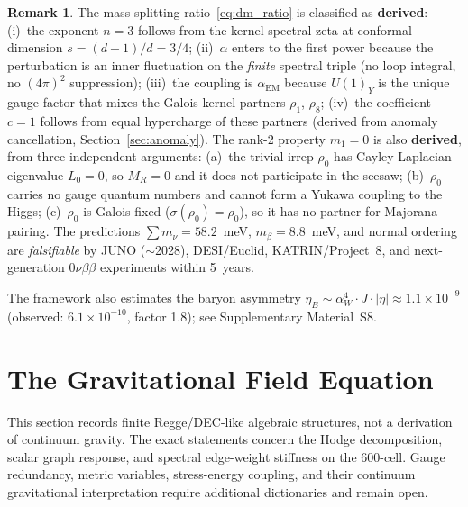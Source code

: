 \documentclass[12pt,a4paper]{article}
\theoremstyle{definition}
\newtheorem{remark}{Remark}
\begin{document}
\begin{remark}
The mass-splitting ratio~\eqref{eq:dm_ratio} is classified as \textbf{derived}: (i)~the exponent $n = 3$ follows from the kernel spectral zeta at conformal dimension $s = (d{-}1)/d = 3/4$; (ii)~$\alpha$ enters to the first power because the perturbation is an inner fluctuation on the \emph{finite} spectral triple (no loop integral, no $(4\pi)^2$ suppression); (iii)~the coupling is $\alpha_{\text{EM}}$ because $U(1)_Y$ is the unique gauge factor that mixes the Galois kernel partners $\rho_1$, $\rho_8$; (iv)~the coefficient $c = 1$ follows from equal hypercharge of these partners (derived from anomaly cancellation, Section~\ref{sec:anomaly}).  The rank-2 property $m_1 = 0$ is also \textbf{derived}, from three independent arguments: (a)~the trivial irrep $\rho_0$ has Cayley Laplacian eigenvalue $L_0 = 0$, so $M_R = 0$ and it does not participate in the seesaw; (b)~$\rho_0$ carries no gauge quantum numbers and cannot form a Yukawa coupling to the Higgs; (c)~$\rho_0$ is Galois-fixed ($\sigma(\rho_0) = \rho_0$), so it has no partner for Majorana pairing.  The predictions $\sum m_\nu = 58.2$~meV, $m_\beta = 8.8$~meV, and normal ordering are \emph{falsifiable} by JUNO ($\sim$2028), DESI/Euclid, KATRIN/Project~8, and next-generation $0\nu\beta\beta$ experiments within 5~years.
\end{remark}

The framework also estimates the baryon asymmetry $\eta_B \sim \alpha_W^4 \cdot J \cdot |\eta| \approx 1.1 \times 10^{-9}$ (observed: $6.1 \times 10^{-10}$, factor 1.8); see Supplementary Material~S8.




\section{The Gravitational Field Equation}
\label{sec:gravity}

This section records finite Regge/DEC-like algebraic structures, not a derivation of continuum gravity.  The exact statements concern the Hodge decomposition, scalar graph response, and spectral edge-weight stiffness on the 600-cell.  Gauge redundancy, metric variables, stress-energy coupling, and their continuum gravitational interpretation require additional dictionaries and remain open.
\end{document}
